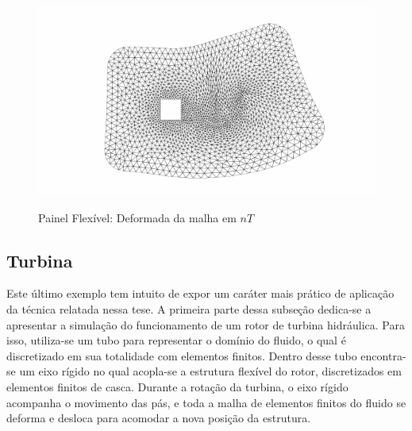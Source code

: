 \begin{figure}[!htbp]
	\label{fig:prism_campos_press}
\end{figure}

\begin{figure}[!htbp]
	\caption{Painel Flexível: Deformada da malha em $nT$}
	\centering 
	\includegraphics[scale=1.0,trim=1cm 0.2cm 1cm 0.2cm, clip=true]{Imagens/Cap7/prism_malha_def.pdf}	
	\label{fig:prisma_defor_malha}
\end{figure}

\subsection{Turbina}

Este último exemplo tem intuito de expor um caráter mais prático de aplicação da técnica relatada nessa tese. A primeira parte dessa subseção dedica-se a apresentar a simulação do funcionamento de um rotor de turbina hidráulica. Para isso, utiliza-se um tubo para representar o domínio do fluido, o qual é discretizado em sua totalidade com elementos finitos. Dentro desse tubo encontra-se um eixo rígido no qual acopla-se a estrutura flexível do rotor, discretizados em elementos finitos de casca. Durante a rotação da turbina, o eixo rígido acompanha o movimento das pás, e toda a malha de elementos finitos do fluido se deforma e desloca para acomodar a nova posição da estrutura.


